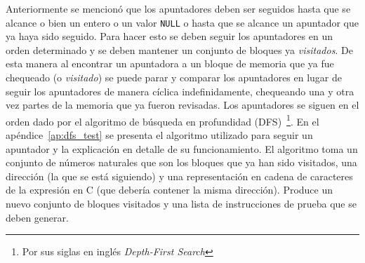 \begin{comment}
\begin{figure}
\begin{lstlisting}[mathescape=true]
context fixes $\mu$ :: mem begin

partial_function (option) dfs
  :: "nat set $\Rightarrow$ addr $\Rightarrow$ string $\Rightarrow$ (nat set $\times$ test_instr list) option"
  where
  [code]: "dfs D a ca = do {
    let (base,ofs) = a;

    case $\mu$!base of
      None $\Rightarrow$ Some (D,[])
    | Some b $\Rightarrow$ do {
        let ca = adjust_addr ofs ca;
        if base $\notin$ D then do {
          let D = insert base D;
          let emit = [Discover ca base];

          fold_option ($\lambda$i (D,emit). do {
            let i=int i;
            let cval = (ofs_addr i (base_var_name base));
            case b!!i of
              None $\Rightarrow$ Some (D,emit)
            | Some (I v) $\Rightarrow$ Some (D,emit @ [Assert_Eq cval v])
            | Some (NullVal) $\Rightarrow$ Some (D,emit @ [Assert_Eq_Null cval] )
            | Some (A addr) $\Rightarrow$ do {
                (D,emit') $\leftarrow$ dfs D addr cval;
                Some (D,emit@emit')
              }
          })
            [0..<length b]
            (D,emit)

        } else do {
          Some (D,[Assert_Eq_Ptr ca base])
        }
      }
  }"
end
\end{lstlisting}

\caption{DFS para generación de pruebas}
\label{fig:dfs_test}
\end{figure}
\end{comment}

Anteriormente se mencionó que los apuntadores deben ser seguidos hasta que se alcance o bien un entero o un valor \verb|NULL| o hasta que se alcance un apuntador que ya haya sido seguido.
Para hacer esto se deben seguir los apuntadores en un orden determinado y se deben mantener un conjunto de bloques ya \textit{visitados}.
De esta manera al encontrar un apuntadora a un bloque de memoria que ya fue chequeado (o \textit{visitado}) se puede parar y comparar los apuntadores en lugar de seguir los apuntadores de manera cíclica indefinidamente, chequeando una y otra vez partes de la memoria que ya fueron revisadas.
Los apuntadores se siguen en el orden dado por el algoritmo de búsqueda en profundidad (DFS)~\footnote{Por sus siglas en inglés \textit{Depth-First Search}}.
En el apéndice~\ref{ap:dfs_test} se presenta el algoritmo utilizado para seguir un apuntador y la explicación en detalle de su funcionamiento.
El algoritmo toma un conjunto de números naturales que son los bloques que ya han sido visitados, una dirección (la que se está siguiendo) y una representación en cadena de caracteres de la expresión en C (que debería contener la misma dirección).
Produce un nuevo conjunto de bloques visitados y una lista de instrucciones de prueba que se deben generar.


